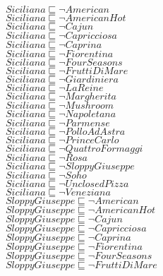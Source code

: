 \documentclass[a4paper,10pt]{article}
\begin{document}
 $Siciliana \sqsubseteq  \lnot American$\\ 
 $Siciliana \sqsubseteq  \lnot AmericanHot$\\ 
 $Siciliana \sqsubseteq  \lnot Cajun$\\ 
 $Siciliana \sqsubseteq  \lnot Capricciosa$\\ 
 $Siciliana \sqsubseteq  \lnot Caprina$\\ 
 $Siciliana \sqsubseteq  \lnot Fiorentina$\\ 
 $Siciliana \sqsubseteq  \lnot FourSeasons$\\ 
 $Siciliana \sqsubseteq  \lnot FruttiDiMare$\\ 
 $Siciliana \sqsubseteq  \lnot Giardiniera$\\ 
 $Siciliana \sqsubseteq  \lnot LaReine$\\ 
 $Siciliana \sqsubseteq  \lnot Margherita$\\ 
 $Siciliana \sqsubseteq  \lnot Mushroom$\\ 
 $Siciliana \sqsubseteq  \lnot Napoletana$\\ 
 $Siciliana \sqsubseteq  \lnot Parmense$\\ 
 $Siciliana \sqsubseteq  \lnot PolloAdAstra$\\ 
 $Siciliana \sqsubseteq  \lnot PrinceCarlo$\\ 
 $Siciliana \sqsubseteq  \lnot QuattroFormaggi$\\ 
 $Siciliana \sqsubseteq  \lnot Rosa$\\ 
 $Siciliana \sqsubseteq  \lnot SloppyGiuseppe$\\ 
 $Siciliana \sqsubseteq  \lnot Soho$\\ 
 $Siciliana \sqsubseteq  \lnot UnclosedPizza$\\ 
 $Siciliana \sqsubseteq  \lnot Veneziana$\\ 
 $SloppyGiuseppe \sqsubseteq  \lnot American$\\ 
 $SloppyGiuseppe \sqsubseteq  \lnot AmericanHot$\\ 
 $SloppyGiuseppe \sqsubseteq  \lnot Cajun$\\ 
 $SloppyGiuseppe \sqsubseteq  \lnot Capricciosa$\\ 
 $SloppyGiuseppe \sqsubseteq  \lnot Caprina$\\ 
 $SloppyGiuseppe \sqsubseteq  \lnot Fiorentina$\\ 
 $SloppyGiuseppe \sqsubseteq  \lnot FourSeasons$\\ 
 $SloppyGiuseppe \sqsubseteq  \lnot FruttiDiMare$\\ 
\end{document}
